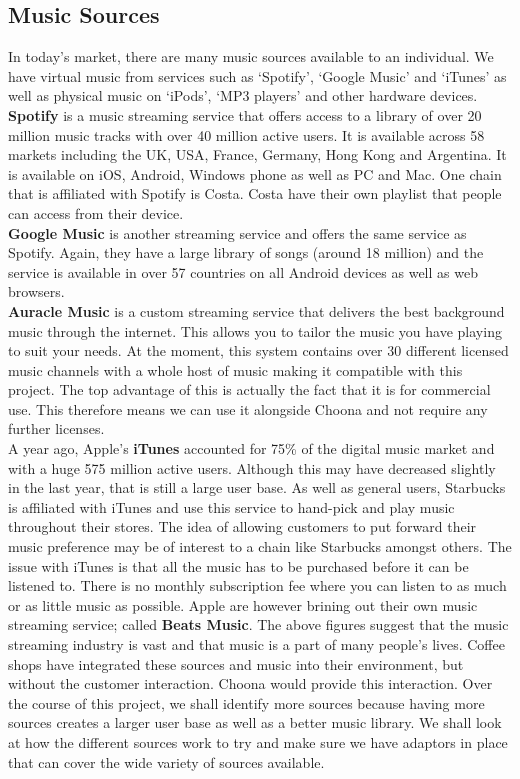 \subsection{\textbf{Music Sources}}
In today's market, there are many music sources available to an individual. We have virtual music from services such as `Spotify', `Google Music' and `iTunes' as well as physical music on `iPods', `MP3 players' and other hardware devices. \\

\textbf{Spotify} is a music streaming service that offers access to a library of over 20 million music tracks with over 40 million active users. It is available across 58 markets including the UK, USA, France, Germany, Hong Kong and Argentina. It is available on iOS, Android, Windows phone as well as PC and Mac. One chain that is affiliated with Spotify is Costa. Costa have their own playlist that people can access from their device. \\
\textbf{Google Music} is another streaming service and offers the same service as Spotify. Again, they have a large library of songs (around 18 million) and the service is available in over 57 countries on all Android devices as well as web browsers. \\
\textbf{Auracle Music} is a custom streaming service that delivers the best background music through the internet.  This allows you to tailor the music you have playing to suit your needs.  At the moment, this system contains over 30 different licensed music channels with a whole host of music making it compatible with this project.  The top advantage of this is actually the fact that it is for commercial use.  This therefore means we can use it alongside Choona and not require any further licenses.  \\
A year ago, Apple's \textbf{iTunes} accounted for 75\% of the digital music market and with a huge 575 million active users. Although this may have decreased slightly in the last year, that is still a large user base. As well as general users, Starbucks is affiliated with iTunes and use this service to hand-pick and play music throughout their stores. The idea of allowing customers to put forward their music preference may be of interest to a chain like Starbucks amongst others. 
The issue with iTunes is that all the music has to be purchased before it can be listened to.  There is no monthly subscription fee where you can listen to as much or as little music as possible.  Apple are however brining out their own music streaming service; called \textbf{Beats Music}.    
The above figures suggest that the music streaming industry is vast and that music is a part of many people's lives. Coffee shops have integrated these sources and music into their environment, but without the customer interaction. Choona would provide this interaction. Over the course of this project, we shall identify more sources because having more sources creates a larger user base as well as a better music library. We shall look at how the different sources work to try and make sure we have adaptors in place that can cover the wide variety of sources available. 

